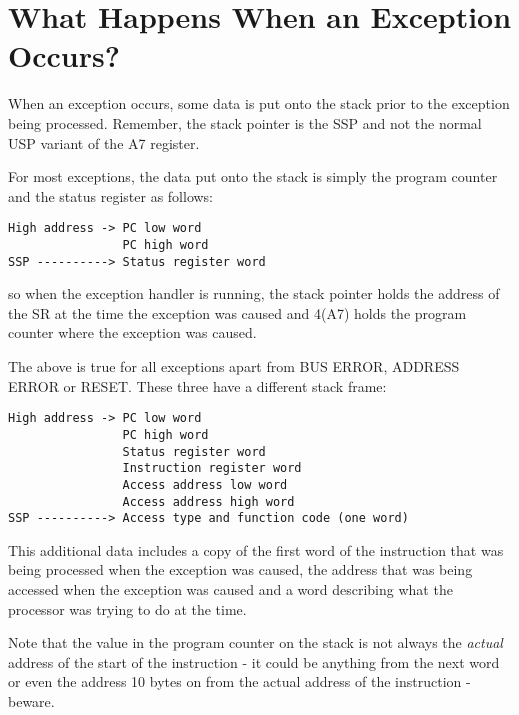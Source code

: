 \section{What Happens When an Exception Occurs?}
\label{ch6-exception-processing}%

When an exception occurs, some data is put onto the stack prior to
    the exception being processed. Remember, the stack pointer is the SSP and
    not the normal USP variant of the A7 register.

For most exceptions, the data put onto the stack is simply the
    program counter and the status register as follows:

\begin{lstlisting}[firstnumber=1,frame=none,numbers=none,language={}]
High address -> PC low word 
                PC high word 
SSP ----------> Status register word
\end{lstlisting}

so when the exception handler is running, the stack pointer holds
    the address of the SR at the time the exception was caused and 4(A7) holds
    the program counter where the exception was caused.

The above is true for all exceptions apart from BUS ERROR, ADDRESS
    ERROR or RESET. These three have a different stack frame:

\begin{lstlisting}[firstnumber=1,frame=none,numbers=none,language={}]
High address -> PC low word 
                PC high word 
                Status register word 
                Instruction register word 
                Access address low word 
                Access address high word 
SSP ----------> Access type and function code (one word)
\end{lstlisting}

This additional data includes a copy of the first word of the
    instruction that was being processed when the exception was caused, the
    address that was being accessed when the exception was caused and a word
    describing what the processor was trying to do at the time.

\begin{warning}
Note that the value in the program counter on the stack is not
      always the \emph{actual} address of the start of the
      instruction -{} it could be anything from the next word or even the
      address 10 bytes on from the actual address of the instruction -{}
      beware.
\end{warning}

